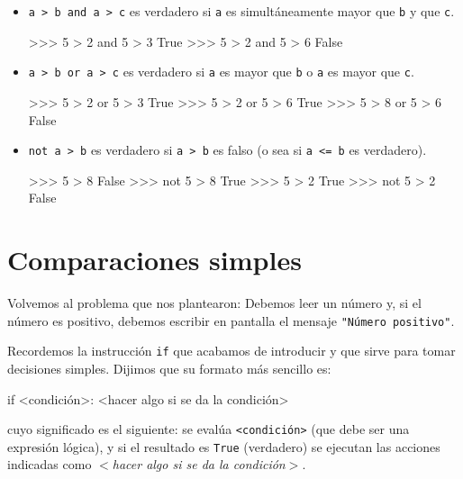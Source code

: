 \begin{itemize}
\item \lstinline!a > b and a > c! es verdadero si \lstinline!a! es
simultáneamente mayor que \lstinline!b! y que \lstinline!c!.

\begin{codigo-python-sn}
>>> 5 > 2 and 5 > 3
True
>>> 5 > 2 and 5 > 6
False
\end{codigo-python-sn}

\item \lstinline!a > b or a > c! es verdadero si \lstinline!a! es mayor que
\lstinline!b! o \lstinline!a! es mayor que \lstinline!c!.

\begin{codigo-python-sn}
>>> 5 > 2 or 5 > 3
True
>>> 5 > 2 or 5 > 6
True
>>> 5 > 8 or 5 > 6
False
\end{codigo-python-sn}

\item \lstinline!not a > b! es verdadero si \lstinline!a > b! es falso (o
sea si \lstinline!a <= b! es verdadero).

\begin{codigo-python-sn}
>>> 5 > 8
False
>>> not 5 > 8
True
>>> 5 > 2
True
>>> not 5 > 2
False
\end{codigo-python-sn}

\end{itemize}

\section{Comparaciones simples}

Volvemos al problema que nos plantearon: Debemos leer un número y, si el
número es positivo, debemos escribir en pantalla el mensaje
 \lstinline!"Número positivo"!.

Recordemos la instrucción \lstinline!if! que acabamos de introducir y que sirve
para tomar decisiones simples. Dijimos que su formato más sencillo es:

\begin{codigo-python-sn}
if <condición>:
    <hacer algo si se da la condición>
\end{codigo-python-sn}

cuyo significado es el siguiente:
se evalúa \lstinline+<condición>+ (que debe ser una expresión lógica), y si el resultado es \lstinline!True! (verdadero) se
ejecutan las acciones indicadas como {\it $<$hacer algo si se da la condición$>$}.

